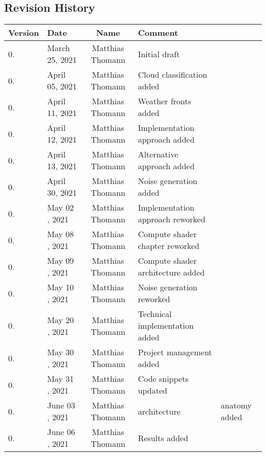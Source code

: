 \subsection{Revision History}
\begin{tabularx}{\textwidth}{|l|l|c|X|}
    \hline
    \textbf{Version}         & \textbf{Date}     & \textbf{Name}     & \textbf{Comment}                  \\ \hline \addtocounter{versionnumber}{1}
    0. & March 25, 2021    & Matthias Thomann  & Initial draft                     \\ \hline \addtocounter{versionnumber}{1}
    0. & April 05, 2021    & Matthias Thomann  & Cloud classification added        \\ \hline \addtocounter{versionnumber}{1}
    0. & April 11, 2021    & Matthias Thomann  & Weather fronts added              \\ \hline \addtocounter{versionnumber}{1}
    0. & April 12, 2021    & Matthias Thomann  & Implementation approach added     \\ \hline \addtocounter{versionnumber}{1}
    0. & April 13, 2021    & Matthias Thomann  & Alternative approach added        \\ \hline \addtocounter{versionnumber}{1}
    0. & April 30, 2021    & Matthias Thomann  & Noise generation added            \\ \hline \addtocounter{versionnumber}{1}
    0. & May 02 , 2021     & Matthias Thomann  & Implementation approach reworked  \\ \hline \addtocounter{versionnumber}{1}
    0. & May 08 , 2021     & Matthias Thomann  & Compute shader chapter reworked   \\ \hline \addtocounter{versionnumber}{1}
    0. & May 09 , 2021     & Matthias Thomann  & Compute shader architecture added \\ \hline \addtocounter{versionnumber}{1}
    0. & May 10 , 2021     & Matthias Thomann  & Noise generation reworked         \\ \hline \addtocounter{versionnumber}{1}
    0. & May 20 , 2021     & Matthias Thomann  & Technical implementation added    \\ \hline \addtocounter{versionnumber}{1}
    0. & May 30 , 2021     & Matthias Thomann  & Project management added          \\ \hline \addtocounter{versionnumber}{1}
    0. & May 31 , 2021     & Matthias Thomann  & Code snippets updated             \\ \hline \addtocounter{versionnumber}{1}
    0. & June 03 , 2021    & Matthias Thomann  & architecture & anatomy added      \\ \hline \addtocounter{versionnumber}{1}
    0. & June 06 , 2021    & Matthias Thomann  & Results added                     \\ \hline
\end{tabularx}